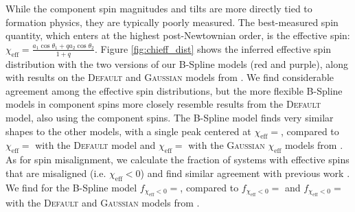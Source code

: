 While the component spin magnitudes and tilts are more directly tied to formation physics, they are typically poorly measured.  The best-measured spin quantity, which enters at the highest post-Newtownian order, is the effective spin: $\chi_\mathrm{eff} = \frac{a_1\cos{\theta_1} + qa_2\cos{\theta_2}}{1+q}$. Figure \ref{fig:chieff_dist} 
shows the inferred effective spin distribution with the two versions of our B-Spline models (red and purple), 
along with results on the \textsc{Default} \citep{Talbot_2017} and \textsc{Gaussian} \citep{Miller2020} models from \citet{o3b_astro_dist}. We find considerable agreement 
among the effective spin distributions, but the more flexible B-Spline models in component spins more closely resemble results from the \textsc{Default} model, also using the component spins. The B-Spline model finds very similar shapes to the other models, with a single peak centered at 
$\chi_\mathrm{eff}=$\result{$\CIPlusMinus{\macros[ChiEffective][iid][PeakChiEff]}$}, compared to 
$\chi_\mathrm{eff}=$\result{$\CIPlusMinus{\macros[ChiEffective][default][PeakChiEff]}$} with the \textsc{Default} model and 
$\chi_\mathrm{eff}=$\result{$\CIPlusMinus{\macros[ChiEffective][gaussian][PeakChiEff]}$} with the \textsc{Gaussian} $\chi_\mathrm{eff}$ models from \citet{o3b_astro_dist}. 
As for spin misalignment, we calculate the fraction of systems with effective spins that are misaligned (i.e. $\chi_\mathrm{eff}<0$) and find similar 
agreement with previous work \citep{o3a_pop,o3b_astro_dist,Callister_NoEvidence}. We find for the B-Spline model 
$f_{\chi_\mathrm{eff}<0}=$\result{$\CIPlusMinus{\macros[ChiEffective][iid][FracBelow0]}$}, compared to 
$f_{\chi_\mathrm{eff}<0}=$\result{$\CIPlusMinus{\macros[ChiEffective][default][FracBelow0]}$} and $f_{\chi_\mathrm{eff}<0}=$\result{$\CIPlusMinus{\macros[ChiEffective][gaussian][FracBelow0]}$} 
with the \textsc{Default} and \textsc{Gaussian} models from \citet{o3b_astro_dist}.

